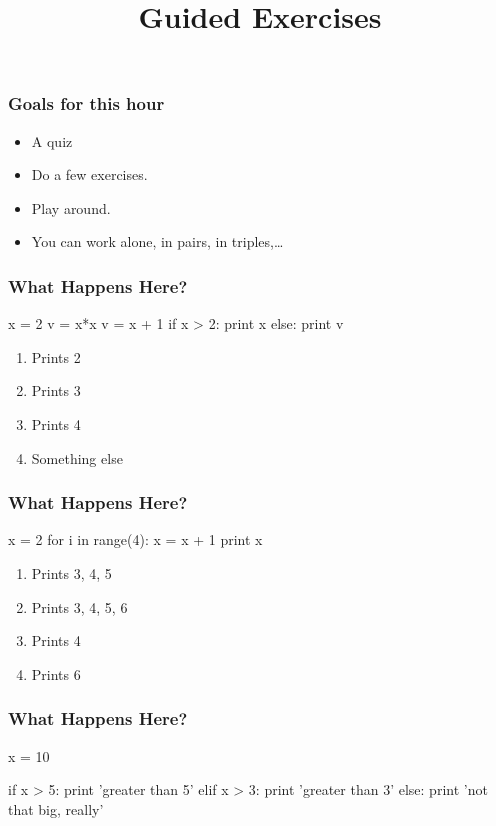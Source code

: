 
\title{Guided Exercises}

\frame{\maketitle}

\begin{frame}
\frametitle{Goals for this hour}

\begin{itemize}
\item A quiz
\item Do a few exercises.
\item Play around.
\item You can work alone, in pairs, in triples,\ldots
\end{itemize}

\end{frame}

\begin{frame}[fragile]
\frametitle{What Happens Here?}
\begin{python}
x = 2
v = x*x
v = x + 1
if x > 2:
    print x
else:
    print v
\end{python}

\begin{enumerate}
\item Prints \alert{2}
\item Prints \alert{3}
\item Prints \alert{4}
\item Something else
\end{enumerate}

\end{frame}

\begin{frame}[fragile]
\frametitle{What Happens Here?}
\begin{python}
x = 2
for i in range(4):
    x = x + 1
print x
\end{python}

\begin{enumerate}
\item Prints \alert{3}, \alert{4}, \alert{5}
\item Prints \alert{3}, \alert{4}, \alert{5}, \alert{6}
\item Prints \alert{4}
\item Prints \alert{6}
\end{enumerate}

\end{frame}

\begin{frame}[fragile]
\frametitle{What Happens Here?}

\begin{python}
x = 10

if x > 5:
    print 'greater than 5'
elif x > 3:
    print 'greater than 3'
else:
    print 'not that big, really'
\end{python}

\end{frame}

